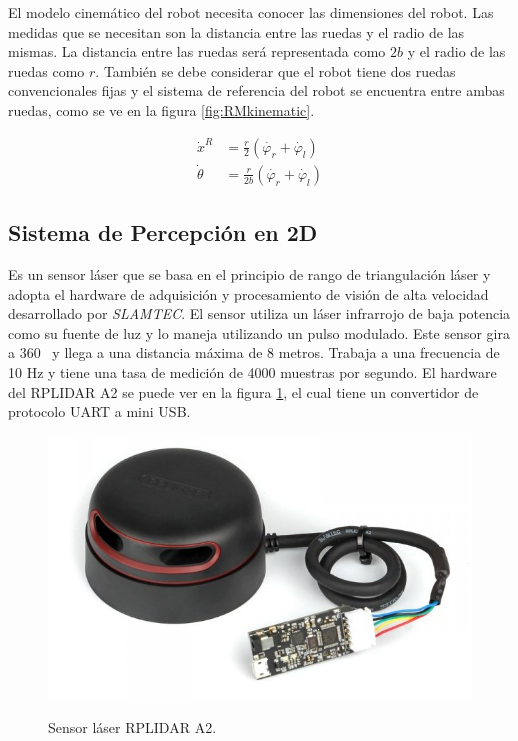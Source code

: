 El modelo cinem\'atico del robot necesita conocer las dimensiones del robot. Las 
medidas que se necesitan son la distancia entre las ruedas y el radio de las 
mismas. La distancia entre las ruedas ser\'a representada como $2b$ y el radio de 
las ruedas como $r$. Tambi\'en se debe considerar que el robot tiene dos ruedas 
convencionales fijas y el sistema de referencia del robot se encuentra entre 
ambas ruedas, como se ve en la figura \ref{fig:RMkinematic}.

\begin{align*}
\dot{x}^{R} &= \frac{r}{2}(\dot{\varphi_{r}} + \dot{\varphi_{l}}) \\
\dot{\theta} &= \frac{r}{2b}(\dot{\varphi_{r}} + \dot{\varphi_{l}})
\end{align*}



\subsection{Sistema de Percepci\'on en 2D}
Es un sensor l\'aser que se basa en el  principio de rango de triangulaci\'on 
láser \cite{amann2001laser} y adopta el hardware de adquisici\'on y 
procesamiento de visi\'on de alta velocidad desarrollado por \textit{SLAMTEC}. El 
sensor utiliza un l\'aser infrarrojo de baja potencia como su fuente de luz y lo 
maneja utilizando un pulso modulado. Este sensor gira a 360 \grad ~y llega a 
una distancia m\'axima de 8 metros. Trabaja a una frecuencia de 10 Hz y 
tiene una tasa de medici\'on de 4000 muestras por segundo. El hardware del 
RPLIDAR A2 se puede ver en la figura \ref{f:lidar}, el cual tiene un 
convertidor de protocolo UART a mini USB.
\begin{figure}%
\centering \footnotesize
 {\includegraphics[width=0.60\linewidth]{images/rplidar.JPG}}
 \captionsetup{font=footnotesize}
 \caption{Sensor láser RPLIDAR A2.}
 \label{f:lidar}
\end{figure}

